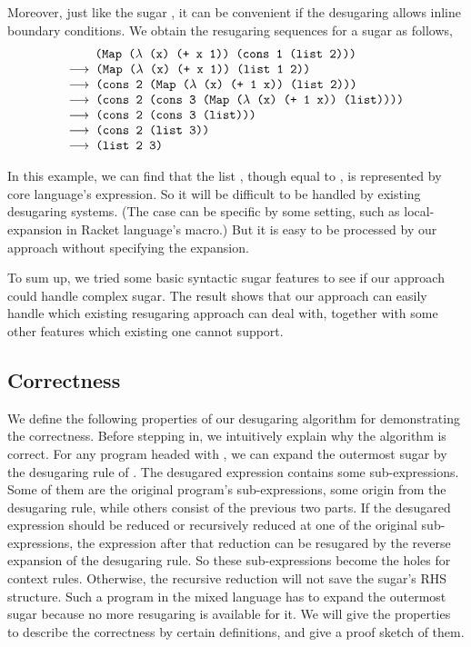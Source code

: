 Moreover, just like the sugar , it can be convenient if the desugaring allows inline boundary conditions. We obtain the resugaring sequences for a  sugar as follows,
\[
	\begin{array}{l}
		\quad\;\;\Code{ (Map ($\lambda$ (x) (+ x 1)) (cons 1 (list 2)))}\\
			\OneStep{ \Code{ (Map ($\lambda$ (x) (+ x 1)) (list 1 2))}}\\
			\OneStep{ \Code{ (cons 2 (Map ($\lambda$ (x) (+ 1 x)) (list 2)))}}\\
			\OneStep{ \Code{ (cons 2 (cons 3 (Map ($\lambda$ (x) (+ 1 x)) (list))))}}\\
			\OneStep{ \Code{ (cons 2 (cons 3 (list)))}}\\
			\OneStep{ \Code{ (cons 2 (list 3))}}\\
			\OneStep{ \Code{ (list 2 3)}}\\
	\end{array}
\]

In this example, we can find that the list , though equal to , is represented by core language's expression. So it will be difficult to be handled by existing desugaring systems. (The case can be specific by some setting, such as local-expansion\cite{10.1017/S0956796812000093} in Racket language's macro.) But it is easy to be processed by our approach without specifying the expansion.

To sum up, we tried some basic syntactic sugar features to see if our approach could handle complex sugar. The result shows that our approach can easily handle which existing resugaring approach can deal with, together with some other features which existing one cannot support.

\subsection{Correctness}
\label{mark:correct}


We define the following properties of our desugaring algorithm for demonstrating the correctness. Before stepping in, we intuitively explain why the algorithm is correct. For any program headed with , we can expand the outermost sugar by the desugaring rule of . The desugared expression contains some sub-expressions. Some of them are the original program's sub-expressions, some origin from the desugaring rule, while others consist of the previous two parts. If the desugared expression should be reduced or recursively reduced at one of the original sub-expressions, the expression after that reduction can be resugared by the reverse expansion of the desugaring rule. So these sub-expressions become the holes for context rules. Otherwise, the recursive reduction will not save the sugar's RHS structure. Such a program in the mixed language has to expand the outermost sugar because no more resugaring is available for it. We will give the properties to describe the correctness by certain definitions, and give a proof sketch of them.



